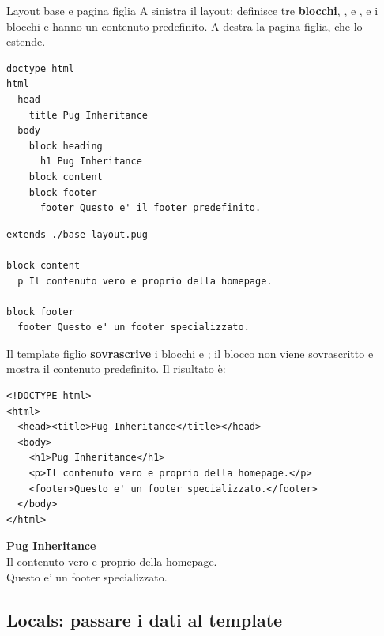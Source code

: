 \begin{esempio}{Layout base e pagina figlia}
A sinistra il layout: definisce tre \textbf{blocchi}, ,
 e , e i blocchi  e 
hanno un contenuto predefinito. A destra la pagina figlia, che lo estende.

\begin{affianco}[0.5]
\begin{lstlisting}[style=pug, name=base-layout.pug]
doctype html
html
  head
    title Pug Inheritance
  body
    block heading
      h1 Pug Inheritance
    block content
    block footer
      footer Questo e' il footer predefinito.
\end{lstlisting}
\risultato
\begin{lstlisting}[style=pug, name=index.pug]
extends ./base-layout.pug

block content
  p Il contenuto vero e proprio della homepage.

block footer
  footer Questo e' un footer specializzato.
\end{lstlisting}
\end{affianco}

Il template figlio \textbf{sovrascrive} i blocchi  e
; il blocco  non viene sovrascritto e mostra il
contenuto predefinito. Il risultato è:

\begin{affianco}[0.6][c]
\begin{lstlisting}[style=html, name=output.html]
<!DOCTYPE html>
<html>
  <head><title>Pug Inheritance</title></head>
  <body>
    <h1>Pug Inheritance</h1>
    <p>Il contenuto vero e proprio della homepage.</p>
    <footer>Questo e' un footer specializzato.</footer>
  </body>
</html>
\end{lstlisting}
\risultato
\begin{browser}
  {\Lora\bfseries\LARGE Pug Inheritance}\\[6pt]
  Il contenuto vero e proprio della homepage.\\[6pt]
  Questo e' un footer specializzato.
\end{browser}
\end{affianco}
\end{esempio}

\subsection{Locals: passare i dati al template}

